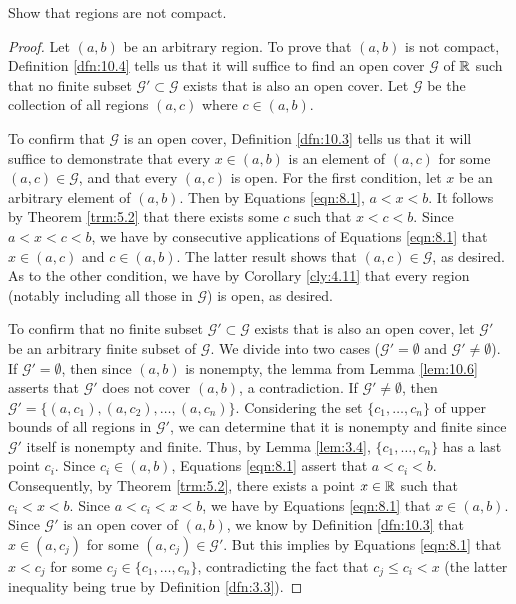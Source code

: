 \documentclass[../main.tex]{subfiles}
\begin{document}
\begin{exercise}\label{exr:10.8}
    Show that regions are not compact.
    \begin{proof}
        Let $(a,b)$ be an arbitrary region. To prove that $(a,b)$ is not compact, Definition \ref{dfn:10.4} tells us that it will suffice to find an open cover $\mathcal{G}$ of $\mathbb{R}$ such that no finite subset $\mathcal{G}'\subset\mathcal{G}$ exists that is also an open cover. Let $\mathcal{G}$ be the collection of all regions $(a,c)$ where $c\in(a,b)$.\par
        To confirm that $\mathcal{G}$ is an open cover, Definition \ref{dfn:10.3} tells us that it will suffice to demonstrate that every $x\in(a,b)$ is an element of $(a,c)$ for some $(a,c)\in\mathcal{G}$, and that every $(a,c)$ is open. For the first condition, let $x$ be an arbitrary element of $(a,b)$. Then by Equations \ref{eqn:8.1}, $a<x<b$. It follows by Theorem \ref{trm:5.2} that there exists some $c$ such that $x<c<b$. Since $a<x<c<b$, we have by consecutive applications of Equations \ref{eqn:8.1} that $x\in(a,c)$ and $c\in(a,b)$. The latter result shows that $(a,c)\in\mathcal{G}$, as desired. As to the other condition, we have by Corollary \ref{cly:4.11} that every region (notably including all those in $\mathcal{G}$) is open, as desired.\par
        To confirm that no finite subset $\mathcal{G}'\subset\mathcal{G}$ exists that is also an open cover, let $\mathcal{G}'$ be an arbitrary finite subset of $\mathcal{G}$. We divide into two cases ($\mathcal{G}'=\emptyset$ and $\mathcal{G}'\neq\emptyset$). If $\mathcal{G}'=\emptyset$, then since $(a,b)$ is nonempty, the lemma from Lemma \ref{lem:10.6} asserts that $\mathcal{G}'$ does not cover $(a,b)$, a contradiction. If $\mathcal{G}'\neq\emptyset$, then $\mathcal{G}'=\{(a,c_1),(a,c_2),\dots,(a,c_n)\}$. Considering the set $\{c_1,\dots,c_n\}$ of upper bounds of all regions in $\mathcal{G}'$, we can determine that it is nonempty and finite since $\mathcal{G}'$ itself is nonempty and finite. Thus, by Lemma \ref{lem:3.4}, $\{c_1,\dots,c_n\}$ has a last point $c_i$. Since $c_i\in(a,b)$, Equations \ref{eqn:8.1} assert that $a<c_i<b$. Consequently, by Theorem \ref{trm:5.2}, there exists a point $x\in\mathbb{R}$ such that $c_i<x<b$. Since $a<c_i<x<b$, we have by Equations \ref{eqn:8.1} that $x\in(a,b)$. Since $\mathcal{G}'$ is an open cover of $(a,b)$, we know by Definition \ref{dfn:10.3} that $x\in(a,c_j)$ for some $(a,c_j)\in\mathcal{G}'$. But this implies by Equations \ref{eqn:8.1} that $x<c_j$ for some $c_j\in\{c_1,\dots,c_n\}$, contradicting the fact that $c_j\leq c_i<x$ (the latter inequality being true by Definition \ref{dfn:3.3}).
    \end{proof}
\end{exercise}
\pagebreak
\end{document}
